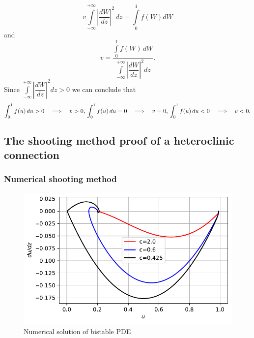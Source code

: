 \documentclass[
  letterpaper,
  DIV=11,
  numbers=noendperiod]{scrreprt}
\theoremstyle{plain}
\theoremstyle{definition}
\theoremstyle{plain}
\theoremstyle{remark}
\begin{document}
\[
 v\int\limits_{-\infty}^{+ \infty} \left|\dfrac{dW}{dz} \right|^2\, dz  =  \int\limits_{0}^{1}f(W) dW 
\] and \[
 v= \dfrac {\int\limits_{0}^{1}f(W) \, dW}{\int\limits_{-\infty}^{+ \infty} \left|\dfrac{dW}{dz} \right|^2 dz}.
\] Since
\(\int\limits_{-\infty}^{+ \infty} \left|\dfrac{dW}{dz} \right|^2 dz >0\)
we can conclude that \[
 \int_{0}^{1}f(u) \, du > 0  \quad  \Longrightarrow  \quad v> 0, \\
  \int_{0}^{1}f(u) \, du =0 \quad  \Longrightarrow  \quad v=0, \\
   \int_{0}^{1}f(u) \, du < 0  \quad  \Longrightarrow \quad v < 0. 
\]

\hypertarget{the-shooting-method-proof-of-a-heteroclinic-connection}{%
\subsection{The shooting method proof of a heteroclinic
connection}\label{the-shooting-method-proof-of-a-heteroclinic-connection}}

\hypertarget{numerical-shooting-method}{%
\subsubsection{Numerical shooting
method}\label{numerical-shooting-method}}

\begin{figure}

{\centering \includegraphics{nonlinearreactiondiffusion_files/figure-pdf/fig-bistablenumtravwave-output-1.pdf}

}

\caption{\label{fig-bistablenumtravwave}Numerical solution of bistable
PDE}

\end{figure}
\end{document}
